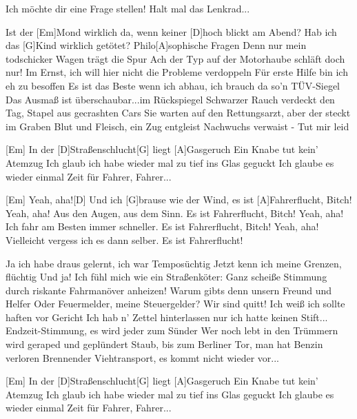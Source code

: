 

\begin{guitar}
	Ich möchte dir eine Frage stellen!
	Halt mal das Lenkrad...
	
	Ist der [Em]Mond wirklich da, wenn keiner [D]hoch blickt am Abend?
	Hab ich das [G]Kind wirklich getötet? Philo[A]sophische Fragen
	Denn nur mein todschicker Wagen trägt die Spur
	Ach der Typ auf der Motorhaube schläft doch nur!
	Im Ernst, ich will hier nicht die Probleme verdoppeln
	Für erste Hilfe bin ich eh zu besoffen
	Es ist das Beste wenn ich abhau, ich brauch da so'n TÜV-Siegel
	Das Ausmaß ist überschaubar...im Rückspiegel
	Schwarzer Rauch verdeckt den Tag, Stapel aus gecrashten Cars
	Sie warten auf den Rettungsarzt, aber der steckt im Graben
	Blut und Fleisch, ein Zug entgleist
	Nachwuchs verwaist - Tut mir leid
	
	\begin{highlightbar}
		[Em] In der [D]Straßenschlucht[G] liegt [A]Gasgeruch
		Ein Knabe tut kein' Atemzug
		Ich glaub ich habe wieder mal zu tief ins Glas geguckt
		Ich glaube es wieder einmal Zeit für Fahrer, Fahrer...
	\end{highlightbar}
	
	\songsection{Post-Refrain}
	[Em] Yeah, aha![D] Und ich [G]brause wie der Wind, es ist [A]Fahrerflucht, Bitch!
	Yeah, aha! Aus den Augen, aus dem Sinn. Es ist Fahrerflucht, Bitch!
	Yeah, aha! Ich fahr am Besten immer schneller. Es ist Fahrerflucht, Bitch!
	Yeah, aha! Vielleicht vergess ich es dann selber. Es ist Fahrerflucht!
	
	\pagebreak
	\songsection{Strophe 2}
	Ja ich habe draus gelernt, ich war Temposüchtig
	Jetzt kenn ich meine Grenzen, flüchtig
	Und ja! Ich fühl mich wie ein Straßenköter: Ganz scheiße
	Stimmung durch riskante Fahrmanöver anheizen!
	Warum gibts denn unsern Freund und Helfer
	Oder Feuermelder, meine Steuergelder?
	Wir sind quitt! Ich weiß ich sollte haften vor Gericht
	Ich hab n' Zettel hinterlassen nur ich hatte keinen Stift...
	Endzeit-Stimmung, es wird jeder zum Sünder
	Wer noch lebt in den Trümmern wird geraped und geplündert
	Staub, bis zum Berliner Tor, man hat Benzin verloren
	Brennender Viehtransport, es kommt nicht wieder vor...
	
	\begin{highlightbar}
		\songsection{Refrain}
		[Em] In der [D]Straßenschlucht[G] liegt [A]Gasgeruch
		Ein Knabe tut kein' Atemzug
		Ich glaub ich habe wieder mal zu tief ins Glas geguckt
		Ich glaube es wieder einmal Zeit für Fahrer, Fahrer...
	\end{highlightbar}
	

\end{guitar}
